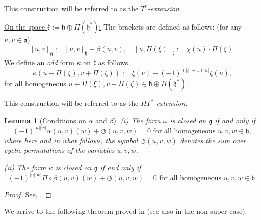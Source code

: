 \documentclass[12pt]{amsart}
\newtheorem{lemma}[Theorem]{Lemma}
\begin{document}
This construction will be referred to as the {\it $T^*$-extension}.%

\underline{On the space $\mathfrak{k}:=\mathfrak{h}\oplus \Pi(\mathfrak{h}^*)$:} The brackets are defined as follows: \textup{(}for any $u, v\in \mathfrak{a}$\textup{)}
\[
\begin{array}{l}
 [u,v]_\mathfrak{g}  :=  [u,v]_\mathfrak{h} +  \beta(u,v), \quad [u, \Pi(\xi)]_\mathfrak{k} :=  \chi (u) \cdot \Pi(\xi).
\end{array}
\]
We define an \emph{odd} form $\kappa$ on $\mathfrak{k}$ as follows
\begin{equation}\label{omegaTstarodd}
\kappa(u+\Pi(\xi), v+ \Pi(\zeta)):= \xi(v) - (-1)^{(|\zeta|+1) |u|} \zeta (u),
\end{equation}
for all homogeneous $u+\Pi(\xi), v+\Pi(\zeta) \in \mathfrak{h}\oplus \Pi(\mathfrak{h}^*)$.

This construction will be referred to as the {\it $\Pi T^*$-extension}.%

\begin{lemma}[Conditions on $\alpha$ and $\beta$] \label{condalphabeta}\textup{(}i\textup{)} The form $\omega$ is closed on $\mathfrak{g}$ if and only if 
\begin{equation}\label{eq5.4}
(-1)^{|u||w|}\alpha(u,v)(w)+ \circlearrowleft (u,v,w)=0 \text{ for all homogeneous  $u,v,w\in\mathfrak{h}$},
\end{equation}
where here and in what follows, the symbol $\circlearrowleft(u,v,w)$ denotes the sum over cyclic permutations 
of the variables $u,v,w$.

\textup{(}ii\textup{)} The form $\kappa$ is closed on $\mathfrak{g}$ if and only if 
\begin{equation}\label{eq5.4b}
(-1)^{|u||w|}\Pi \circ \beta(u,v)(w)+ \circlearrowleft (u,v,w)=0 \text{ for all homogeneous $u,v,w\in\mathfrak{h}$}.
\end{equation}

\end{lemma}
\begin{proof}
See, \cite{BM}.
\end{proof}
We arrive to the following theorem proved in \cite{BM} (see also \cite{BC} in the non-super case).
\end{document}
